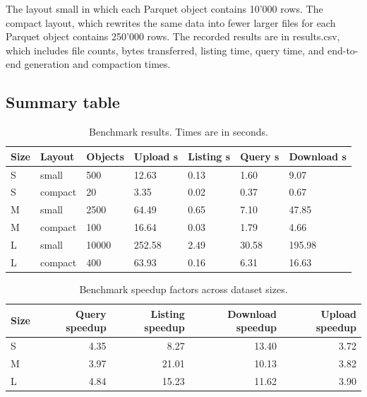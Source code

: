 \documentclass{article}
\begin{document}
The layout small in which each Parquet object contains 10'000 rows. The compact layout, which rewrites the same data into fewer larger files for each Parquet object contains 250'000 rows. The recorded results are in results.csv, which includes file counts, bytes transferred, listing time, query time, and end-to-end generation and compaction times.

\subsection{Summary table}

\begin{table}[h]
\centering
\footnotesize
\begin{tabular}{lllllll}
\hline
Size & Layout & Objects & Upload s & Listing s & Query s & Download s \\
\hline
S & small & 500 & 12.63 & 0.13 & 1.60 & 9.07 \\
S & compact & 20 & 3.35 & 0.02 & 0.37 & 0.67 \\
M & small & 2500 & 64.49 & 0.65 & 7.10 & 47.85 \\
M & compact & 100 & 16.64 & 0.03 & 1.79 & 4.66 \\
L & small & 10000 & 252.58 & 2.49 & 30.58 & 195.98 \\
L & compact & 400 & 63.93 & 0.16 & 6.31 & 16.63 \\
\hline
\end{tabular}
\caption{Benchmark results. Times are in seconds.}
\label{table_benchmark}
\end{table}

\begin{table}[htbp]
    \centering
    \footnotesize
    \begin{tabular}{lrrrr}
        \hline
        Size & Query speedup & Listing speedup & Download speedup & Upload speedup \\
        \hline
        S & 4.35 & 8.27 & 13.40 & 3.72 \\
        M & 3.97 & 21.01 & 10.13 & 3.82 \\
        L & 4.84 & 15.23 & 11.62 & 3.90 \\
        \hline
    \end{tabular}
    \caption{Benchmark speedup factors across dataset sizes.}
    \label{table_speedup}
\end{table}
\end{document}
